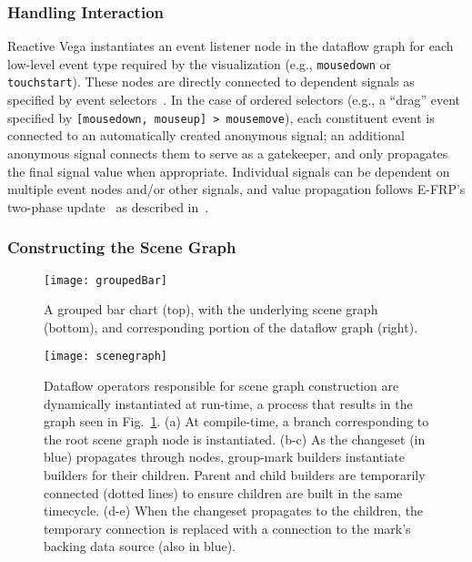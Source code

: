 \subsubsection{Handling Interaction}

Reactive Vega instantiates an event listener node in the dataflow graph for each
low-level event type required by the visualization (e.g., \texttt{mousedown} or
\texttt{touchstart}). These nodes are directly connected to dependent signals as
specified by event selectors~\cite{satyanarayan:declarative}. In the case of
ordered selectors (e.g., a ``drag'' event specified by \texttt{[mousedown,
mouseup] > mousemove}), each constituent event is connected to an automatically
created anonymous signal; an additional anonymous signal connects them to serve
as a gatekeeper, and only propagates the final signal value when appropriate.
Individual signals can be dependent on multiple event nodes and/or other
signals, and value propagation follows E-FRP's two-phase update~\cite{wan:efrp}
as described in~.

\subsubsection{Constructing the Scene Graph}

\begin{figure}[h!]
  \centering
  \texttt{[image: groupedBar]}
  \caption{A grouped bar chart (top), with the underlying scene graph (bottom),
  and corresponding portion of the dataflow graph (right).}
  \label{fig:vg:groupedBar}
\end{figure}

\begin{figure}[h!]
  \centering
  \texttt{[image: scenegraph]}
  \caption{Dataflow operators responsible for scene graph construction are
dynamically instantiated at run-time, a process that results in the graph seen
in Fig.~\ref{fig:vg:groupedBar}. (a) At compile-time, a branch corresponding  to
the root scene graph node is instantiated. (b-c) As the changeset (in blue)
propagates through nodes, group-mark builders instantiate builders for their
children. Parent and child builders are temporarily connected (dotted lines) to
ensure children are built in the same timecycle. (d-e) When the changeset
propagates to the children, the temporary connection is replaced with a
connection to the mark's backing data source (also in blue).}
  \label{fig:vg:scenegraph}
\end{figure}

